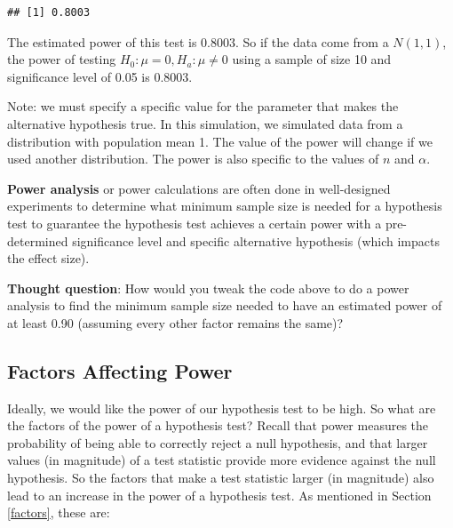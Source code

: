 \documentclass[
]{book}
\theoremstyle{definition}
\theoremstyle{definition}
\theoremstyle{definition}
\theoremstyle{definition}
\theoremstyle{remark}
\begin{document}
\begin{verbatim}
## [1] 0.8003
\end{verbatim}

The estimated power of this test is 0.8003. So if the data come from a \(N(1,1)\), the power of testing \(H_0: \mu = 0, H_a: \mu \neq 0\) using a sample of size 10 and significance level of 0.05 is 0.8003.

Note: we must specify a specific value for the parameter that makes the alternative hypothesis true. In this simulation, we simulated data from a distribution with population mean 1. The value of the power will change if we used another distribution. The power is also specific to the values of \(n\) and \(\alpha\).

\textbf{Power analysis} or power calculations are often done in well-designed experiments to determine what minimum sample size is needed for a hypothesis test to guarantee the hypothesis test achieves a certain power with a pre-determined significance level and specific alternative hypothesis (which impacts the effect size).

\textbf{Thought question}: How would you tweak the code above to do a power analysis to find the minimum sample size needed to have an estimated power of at least 0.90 (assuming every other factor remains the same)?

\hypertarget{factors-affecting-power}{%
\subsection{Factors Affecting Power}\label{factors-affecting-power}}

Ideally, we would like the power of our hypothesis test to be high. So what are the factors of the power of a hypothesis test? Recall that power measures the probability of being able to correctly reject a null hypothesis, and that larger values (in magnitude) of a test statistic provide more evidence against the null hypothesis. So the factors that make a test statistic larger (in magnitude) also lead to an increase in the power of a hypothesis test. As mentioned in Section \ref{factors}, these are:
\end{document}
